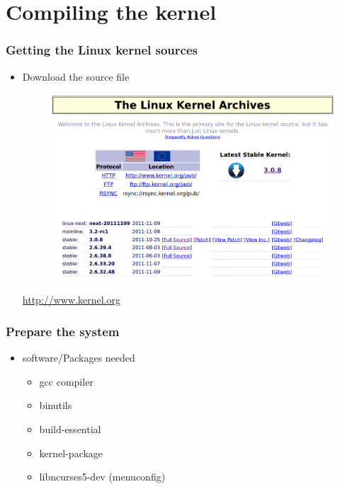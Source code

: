 \documentclass{beamer}
\begin{document}
\section{Compiling the kernel}

\begin{frame}
\frametitle{Getting the Linux kernel sources}

\begin{itemize}
\item Download the source file
 
\begin{figure}
  \centering
	\includegraphics[scale=0.25,clip=true]{figs/kernel_site.png}
  \label{fig:kernel_site}
\end{figure}

\begin{center}
  {\small\url{http://www.kernel.org}}
\end{center}

\end{itemize}

\end{frame}


\begin{frame}
\frametitle{Prepare the system}

\begin{itemize}
\item software/Packages needed 
    \begin{itemize}
    \item gcc compiler
    \item binutils
    \item build-essential
    \item kernel-package
    \item libncurses5-dev (menuconfig)
\end{itemize}
\end{itemize}

\end{frame}
\end{document}

